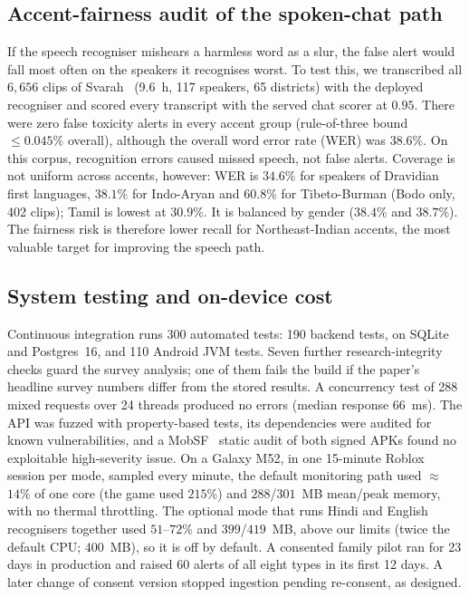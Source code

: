 \documentclass[conference]{IEEEtran}
\begin{document}
\subsection{Accent-fairness audit of the spoken-chat path}
If the speech recogniser mishears a harmless word as a slur, the false alert would fall
most often on the speakers it recognises worst. To test this, we transcribed all
$6{,}656$ clips of Svarah~\cite{svarah2023} (9.6~h, 117 speakers, 65 districts) with
the deployed recogniser and scored every transcript with the served chat scorer at
$0.95$. There were zero false toxicity alerts in every accent group (rule-of-three
bound $\leq0.045\%$ overall), although the overall word error rate (WER) was $38.6\%$.
On this corpus, recognition errors caused missed speech, not false alerts. Coverage is
not uniform across accents, however: WER is $34.6\%$ for speakers of Dravidian first
languages, $38.1\%$ for Indo-Aryan and $60.8\%$ for Tibeto-Burman (Bodo only, 402
clips); Tamil is lowest at $30.9\%$. It is balanced by gender ($38.4\%$ and $38.7\%$).
The fairness risk is therefore lower recall for Northeast-Indian accents, the most
valuable target for improving the speech path.

\subsection{System testing and on-device cost}
Continuous integration runs 300 automated tests: 190 backend tests, on SQLite and
Postgres~16, and 110 Android JVM tests. Seven further research-integrity checks guard
the survey analysis; one of them fails the build if the paper's headline survey numbers
differ from the stored results. A concurrency test of 288 mixed requests over 24
threads produced no errors (median response 66~ms). The API was fuzzed with
property-based tests, its dependencies were audited for known vulnerabilities, and a
MobSF~\cite{mobsf} static audit of both signed APKs found no exploitable high-severity
issue. On a Galaxy M52, in one 15-minute Roblox session per mode, sampled every minute,
the default monitoring path used $\approx$$14\%$ of one core (the game used $215\%$)
and $288$/$301$~MB mean/peak memory, with no thermal throttling. The optional mode that
runs Hindi and English recognisers together used $51$--$72\%$ and $399$/$419$~MB, above
our limits (twice the default CPU; 400~MB), so it is off by default. A consented family
pilot ran for 23 days in production and raised 60 alerts of all eight types in its
first 12 days. A later change of consent version stopped ingestion pending re-consent,
as designed.
\end{document}

